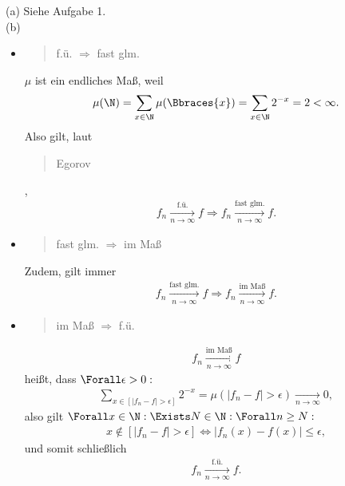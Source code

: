 \begin{solution}

(a) Siehe Aufgabe 1. \\

(b) \phantom{}

\begin{itemize}

  \item \blockquote{f.ü. $\Rightarrow$ fast glm.}: $\mu$ ist ein endliches Maß, weil
  \begin{align*}
    \mu(\N)
    =
    \sum_{x \in \N} \mu(\Bbraces{x})
    =
    \sum_{x \in \N} 2^{-x}
    =
    2 < \infty.
  \end{align*}
  Also gilt, laut \blockquote{Egorov},
  \begin{align*}
    f_n \xrightarrow[n \to \infty]{\text{f.ü.}} f
    \Rightarrow
    f_n \xrightarrow[n \to \infty]{\text{fast glm.}} f.
  \end{align*}

  \item \blockquote{fast glm. $\Rightarrow$ im Maß}: Zudem, gilt immer
  \begin{align*}
    f_n \xrightarrow[n \to \infty]{\text{fast glm.}} f
    \Rightarrow
    f_n \xrightarrow[n \to \infty]{\text{im Maß}} f.
  \end{align*}

  \item \blockquote{im Maß $\Rightarrow$ f.ü.}:
  \begin{align*}
    f_n \xrightarrow[n \to \infty]{\text{im Maß}} f
  \end{align*}
  heißt, dass $\Forall \epsilon > 0:$
  \begin{align*}
    \sum_{x \in [|f_n - f| > \epsilon]} 2^{-x}
    =
    \mu(|f_n - f| > \epsilon)
    \xrightarrow[n \to \infty]{} 0,
  \end{align*}
  also gilt $\Forall x \in \N: \Exists N \in \N: \Forall n \geq N:$
  \begin{align*}
    x \notin [|f_n - f| > \epsilon]
    \Leftrightarrow
    |f_n(x) - f(x)| \leq \epsilon,
  \end{align*}
  und somit schließlich
  \begin{align*}
    f_n \xrightarrow[n \to \infty]{\text{f.ü.}} f.
  \end{align*}

\end{itemize}

\end{solution}

